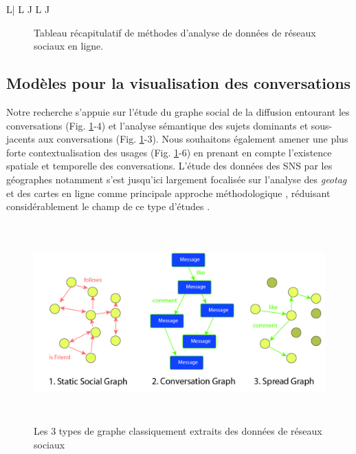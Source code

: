 \begin{landscape}
{\begin{spacing}{1}
\begin{ltabulary}{L| L J L J}
    \end{ltabulary}
    \end{spacing} %
    \begin{figure}
        \caption[Tableau récapitulatif de méthodes d{\textquoteright}analyse de données de réseaux sociaux en ligne.]{Tableau récapitulatif de méthodes d{\textquoteright}analyse de données de réseaux sociaux en ligne.}
        \label{tab:sna}
    \end{figure}
}
\end{landscape}

\subsection[Modèles pour la visualisation des conversations]{Modèles pour la visualisation des conversations}

Notre recherche s'appuie sur l{\textquoteright}étude du graphe social de la diffusion entourant les conversations (Fig. \ref{tab:sna}-4) et l{\textquoteright}analyse sémantique des sujets dominants et sous-jacents aux conversations (Fig. \ref{tab:sna}-3). Nous souhaitons également amener une plus forte contextualisation des usages (Fig. \ref{tab:sna}-6) en prenant en compte l{\textquoteright}existence spatiale et temporelle des conversations. L'étude des données des SNS par les géographes notamment s{\textquoteright}est jusqu{\textquoteright}ici largement focalisée sur l{\textquoteright}analyse des \textit{geotag} et des cartes en ligne comme principale approche méthodologique \citep{Graham2011, Poorthuis2013}, réduisant considérablement le champ de ce type d'études \citep{Crampton2013}.

\begin{figure}[htbp]
    \centering
    \includegraphics[width=6.2894in,height=3.0004in]{figures/chap3/chapitre3-img9.jpg}
    \caption[3 modèles de réseau]{Les 3 types de graphe classiquement extraits des données de réseaux sociaux}
\end{figure}


